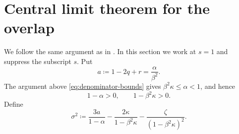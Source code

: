 \documentclass[11pt]{article}
\numberwithin{equation}{section}
\newcommand{\1}{\mathbf 1}
\begin{document}

\section{Central limit theorem for the overlap}
\label{sec:overlap-clt}

We follow the same argument as in \cite[Chapter 1]{Talagrand}. In this section we work at $s=1$ and suppress the subscript $s$.  Put
\[
 a\coloneqq1-2q+r=\frac{\alpha}{\beta^2}.
\]
The argument above \eqref{eq:denominator-bounds} gives
$\beta^2\kappa\le\alpha<1$, and hence
\begin{equation}
 1-\alpha>0,\qquad
 1-\beta^2\kappa>0.
 \label{eq:clt-positive-denominators}
\end{equation}
Define
\begin{equation}
 \sigma^2
 \coloneqq
 \frac{3a}{1-\alpha}
 -\frac{2\kappa}{1-\beta^2\kappa}
 -\frac{\zeta}{(1-\beta^2\kappa)^2}.
 \label{eq:clt-variance}
\end{equation}
\end{document}
